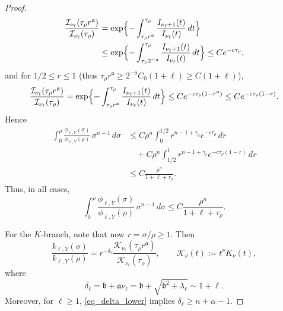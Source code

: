 \documentclass[10pt,a4paper]{amsart}
\begin{document}
\begin{proof}
\begin{align*}
\frac{\mathcal I_{\nu_\ell}(\tau_\rho r^{\mathfrak a})}{\mathcal I_{\nu_\ell}(\tau_\rho)}
&=
\exp\Bigl\{-\int_{\tau_\rho r^{\mathfrak a}}^{\tau_\rho}\frac{I_{\nu_\ell+1}(t)}{I_{\nu_\ell}(t)}\,dt\Bigr\} \\
&\le
\exp\Bigl\{-\int_{\tau_\rho 2^{-\mathfrak a}}^{\tau_\rho}\frac{I_{\nu_\ell+1}(t)}{I_{\nu_\ell}(t)}\,dt\Bigr\}
\le C e^{-c \tau_\rho},
\end{align*}
and for $1/2\le r \le 1$ (thus $\tau_\rho r^{\mathfrak a} \ge 2^{- \mathfrak a} C_0 (1+\ell) \ge C(1+\ell)$),
\begin{equation*}
\frac{\mathcal I_{\nu_\ell}(\tau_\rho r^{\mathfrak a})}{\mathcal I_{\nu_\ell}(\tau_\rho)}
=\exp\Bigl\{-\int_{\tau_\rho r^{\mathfrak a}}^{\tau_\rho}\frac{I_{\nu_\ell+1}(t)}{I_{\nu_\ell}(t)}\,dt\Bigr\}
\le C e^{-c \tau_\rho(1-r^{\mathfrak a})}
\le C e^{-c \tau_\rho(1-r)}.
\end{equation*}
Hence
\begin{align*}
   \int_0^\rho \frac{\phi_{\ell,Y}(\sigma)}{\phi_{\ell,Y}(\rho)}\,\sigma^{n-1}\,d\sigma
   &\le
    C\rho^n \int_0^{1/2} r^{n-1+\gamma_\ell} e^{-c\tau_\rho}\,dr\\
    &\quad+ C\rho^n \int_{1/2}^1 r^{n-1+\gamma_\ell}e^{-c\tau_\rho(1-r)}\,dr\\
    &\le C\frac{\rho^n}{1+\ell+\tau_\rho}.
\end{align*}
Thus, in all cases,
\begin{equation}\label{eq_I_ratio_integral_final}
    \int_0^\rho
        \frac{\phi_{\ell,Y}(\sigma)}
             {\phi_{\ell,Y}(\rho)}
    \, \sigma^{n-1} \, d\sigma
    \le
    C\frac{\rho^n}{1+\ell+\tau_\rho}.
\end{equation}

For the $K$-branch, note that now $r=\sigma/\rho \ge 1$. Then
\begin{equation}\label{eq_K_ratio}
    \frac{k_{\ell,Y}(\sigma)}
         {k_{\ell,Y}(\rho)}
    =
    r^{-\delta_\ell}
    \frac{\mathcal K_{\nu_\ell}(\tau_\rho r^{\mathfrak a})}
         {\mathcal K_{\nu_\ell}(\tau_\rho)},
    \qquad
    \mathcal K_\nu(t):=t^\nu K_\nu(t),
\end{equation}
where
\begin{equation*}
    \delta_\ell=\mathfrak b+\mathfrak a\nu_\ell =
    \mathfrak b+\sqrt{\mathfrak b^2+\lambda_\ell}
    \sim 1+\ell.
\end{equation*}
Moreover, for $\ell\ge 1$, \eqref{eq_delta_lower} implies $\delta_\ell\ge n+\alpha-1$.


\end{proof}
\end{document}
